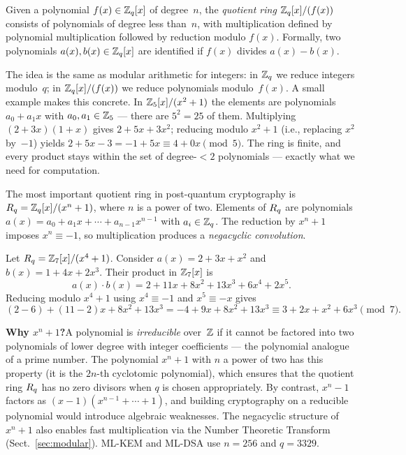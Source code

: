 \begin{definition}
\label{def:quotient-poly-ring}
Given a polynomial $f(x) \in \mathbb{Z}_q[x]$ of degree~$n$, the \emph{quotient ring} $\mathbb{Z}_q[x]/(f(x))$ consists of polynomials of degree less than~$n$, with multiplication defined by polynomial multiplication followed by reduction modulo $f(x)$.  Formally, two polynomials $a(x), b(x) \in \mathbb{Z}_q[x]$ are identified if $f(x)$ divides $a(x) - b(x)$.
\end{definition}

The idea is the same as modular arithmetic for integers: in $\mathbb{Z}_q$ we reduce integers modulo~$q$; in $\mathbb{Z}_q[x]/(f(x))$ we reduce polynomials modulo~$f(x)$.  A small example makes this concrete.  In $\mathbb{Z}_5[x]/(x^2 + 1)$ the elements are polynomials $a_0 + a_1 x$ with $a_0, a_1 \in \mathbb{Z}_5$ --- there are $5^2 = 25$ of them.  Multiplying $(2 + 3x)(1 + x)$ gives $2 + 5x + 3x^2$; reducing modulo $x^2 + 1$ (i.e., replacing $x^2$ by~$-1$) yields $2 + 5x - 3 = -1 + 5x \equiv 4 + 0x \pmod{5}$.  The ring is finite, and every product stays within the set of degree-$<2$ polynomials --- exactly what we need for computation.

The most important quotient ring in post-quantum cryptography is $R_q = \mathbb{Z}_q[x]/(x^n + 1)$, where $n$ is a power of two.  Elements of $\Rq$ are polynomials $a(x) = a_0 + a_1 x + \cdots + a_{n-1}x^{n-1}$ with $a_i \in \mathbb{Z}_q$.  The reduction by $x^n + 1$ imposes $x^n \equiv -1$, so multiplication produces a \emph{negacyclic convolution}.

\begin{example}[Multiplication in $\Rq$]
\label{ex:rq-mult}
Let $R_q = \mathbb{Z}_7[x]/(x^4 + 1)$.  Consider $a(x) = 2 + 3x + x^2$ and $b(x) = 1 + 4x + 2x^3$.  Their product in $\mathbb{Z}_7[x]$ is
\[
a(x) \cdot b(x) = 2 + 11x + 8x^2 + 13x^3 + 6x^4 + 2x^5.
\]
Reducing modulo $x^4 + 1$ using $x^4 \equiv -1$ and $x^5 \equiv -x$ gives
\[
(2 - 6) + (11 - 2)x + 8x^2 + 13x^3 = -4 + 9x + 8x^2 + 13x^3 \equiv 3 + 2x + x^2 + 6x^3 \pmod{7}.
\]
\end{example}

\begin{svgraybox}
\textbf{Why $x^n + 1$?}\enspace A polynomial is \emph{irreducible} over~$\mathbb{Z}$ if it cannot be factored into two polynomials of lower degree with integer coefficients --- the polynomial analogue of a prime number.  The polynomial $x^n + 1$ with $n$ a power of two has this property (it is the $2n$-th cyclotomic polynomial), which ensures that the quotient ring $\Rq$ has no zero divisors when $q$ is chosen appropriately.  By contrast, $x^n - 1$ factors as $(x-1)(x^{n-1} + \cdots + 1)$, and building cryptography on a reducible polynomial would introduce algebraic weaknesses.  The negacyclic structure of $x^n + 1$ also enables fast multiplication via the Number Theoretic Transform (Sect.~\ref{sec:modular}).  ML-KEM and ML-DSA use $n = 256$ and $q = 3329$.
\end{svgraybox}


